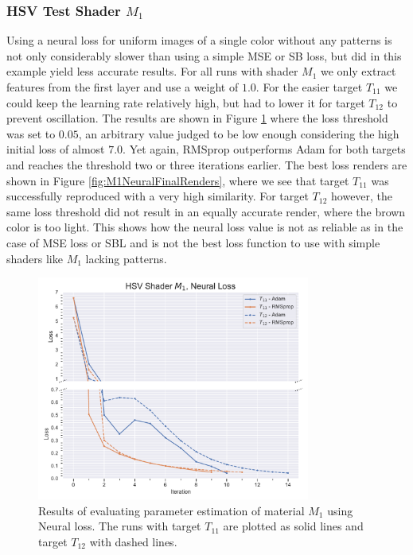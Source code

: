 \subsubsection{HSV Test Shader $M_1$}


Using a neural loss for uniform images of a single color without any patterns is not only considerably slower than using a simple MSE or SB loss, but did in this example yield less accurate results. For all runs with shader $M_1$ we only extract features from the first layer and use a weight of $1.0$. For the easier target $T_{11}$ we could keep the learning rate relatively high, but had to lower it for target $T_{12}$ to prevent oscillation. The results are shown in Figure \ref{fig:M1NeuralData} where the loss threshold was set to $0.05$, an arbitrary value judged to be low enough considering the high initial loss of almost $7.0$. Yet again, RMSprop outperforms Adam for both targets and reaches the threshold two or three iterations earlier. The best loss renders are shown in Figure \ref{fig:M1NeuralFinalRenders}, where we see that target $T_{11}$ was successfully reproduced with a very high similarity. For target $T_{12}$ however, the same loss threshold did not result in an equally accurate render, where the brown color is too light. This shows how the neural loss value is not as reliable as in the case of MSE loss or SBL and is not the best loss function to use with simple shaders like $M_1$ lacking patterns.

\begin{figure}
    \centering
    \includegraphics[width=0.8\textwidth]{img/evaluation/M1/HSV_NEURAL.pdf}
    \caption{Results of evaluating parameter estimation of material $M_1$ using Neural loss. The runs with target $T_{11}$ are plotted as solid lines and target $T_{12}$ with dashed lines.}
    \label{fig:M1NeuralData}
\end{figure}


